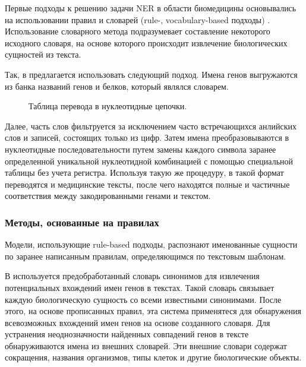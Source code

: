 \documentclass[12pt, a4paper]{article} %
\begin{document}
Первые подходы к решению задачи NER в области биомедицины основывались на использовании правил и словарей (rule-, vocabulary-based подходы) \cite{UlfLeser2005}. Использование словарного метода подразумевает составление некоторого исходного словаря, на основе которого происходит извлечение биологических сущностей из текста. 

Так, в \cite{Krauthammer2001} предлагается использовать следующий подход. Имена генов выгружаются из банка названий генов и белков, который являлся словарем. 
\begin{figure}[h]
	\caption{Таблица перевода в нуклеотидные цепочки.}
	\label{ris:image1}
\end{figure}
Далее, часть слов фильтруется за исключением часто встречающихся анлийских слов и записей, состоящих только из цифр. Затем имена преобразовываются в нуклеотидные последовательности путем замены каждого символа заранее определенной уникальной нуклеотидной комбинацией с помощью специальной таблицы без учета регистра. Используя такую же процедуру, в такой формат переводятся и медицинские тексты, после чего находятся полные и частичные соответствия между закодированными генами и текстом.

\subsubsection{Методы, основанные на правилах}
Модели, использующие rule-based подходы, распознают именованные сущности по заранее написанным правилам, определяющимся по текстовым шаблонам. 

В \cite{Hanisch2005} используется предобработанный словарь синонимов для извлечения потенциальных вхождений имен генов в текстах. Такой словарь связывает каждую биологическую сущность со всеми известными синонимами. После этого, на основе прописанных правил, эта система применятеся для обнаружения всевозможных вхождений имен генов на основе созданного словаря. Для устранения неоднозначности найденных совпадений генов в тексте обнаруживаются имена из внешних словарей. Эти внешние словари содержат сокращения, названия организмов, типы клеток и другие биологические объекты.
\end{document}
